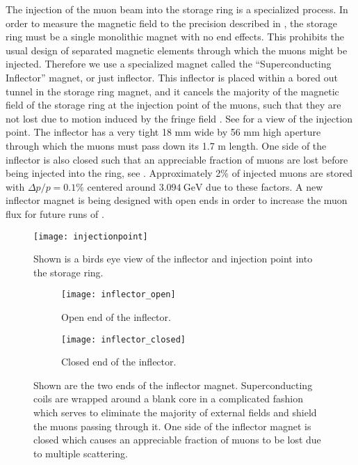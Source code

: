 The injection of the muon beam into the \gmtwo storage ring is a specialized process. In order to measure the magnetic field to the precision described in , the \gmtwo storage ring must be a single monolithic magnet with no end effects. This prohibits the usual design of separated magnetic elements through which the muons might be injected. Therefore we use a specialized magnet called the ``Superconducting Inflector'' magnet, or just inflector. This inflector is placed within a bored out tunnel in the storage ring magnet, and it cancels the majority of the magnetic field of the storage ring at the injection point of the muons, such that they are not lost due to motion induced by the fringe field \cite{inflector}. See  for a view of the injection point. The inflector has a very tight 18 mm wide by 56 mm high aperture through which the muons must pass down its 1.7 m length. One side of the inflector is also closed such that an appreciable fraction of muons are lost before being injected into the ring, see . Approximately 2\% of injected muons are stored with $\Delta p / p = 0.1\%$ centered around $\SI{3.094}{\GeV}$ due to these factors. A new inflector magnet is being designed with open ends in order to increase the muon flux for future runs of \gmtwo \cite{TDR}.


\begin{figure}[]
    \centering
    \texttt{[image: injectionpoint]}
    \caption[Muon injection point through inflector]{Shown is a birds eye view of the inflector and injection point into the storage ring.}   
    \label{fig:injectionpoint}
\end{figure}

\begin{figure}[]
\centering
    \begin{subfigure}[]{0.46\textwidth}
        \centering
        \texttt{[image: inflector\_open]}
        \caption{Open end of the inflector.}
    \end{subfigure}%
    \hspace{1cm}
    \begin{subfigure}[]{0.45\textwidth}
        \centering
        \texttt{[image: inflector\_closed]}
        \caption{Closed end of the inflector.}
    \end{subfigure}
\caption[Superconducting Inflector magnet]{Shown are the two ends of the inflector magnet. Superconducting coils are wrapped around a blank core in a complicated fashion which serves to eliminate the majority of external fields and shield the muons passing through it. One side of the inflector magnet is closed which causes an appreciable fraction of muons to be lost due to multiple scattering.}
\label{fig:inflector}
\end{figure}


